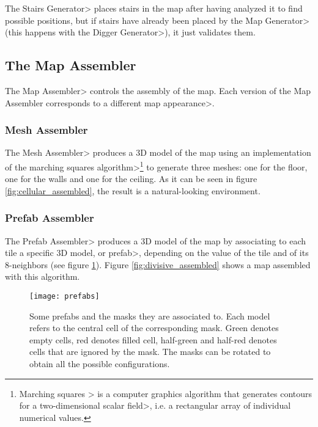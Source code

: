 The \<Stairs Generator> places stairs in the map after having analyzed it to find possible positions, but if stairs have already been placed by the \<Map Generator> (this happens with the \<Digger Generator>), it just validates them.


\subsection{The Map Assembler}

The \<Map Assembler> controls the assembly of the map. Each version of the Map Assembler corresponds to a different \<map appearance>.


\subsubsection{Mesh Assembler}

The \<Mesh Assembler> produces a 3D model of the map using an implementation of the \<marching squares algorithm>\footnote{\<Marching squares > is a computer graphics algorithm that generates contours for a \<two-dimensional scalar field>, i.e. a rectangular array of individual numerical values.} to generate three meshes: one for the floor, one for the walls and one for the ceiling. As it can be seen in figure \ref{fig:cellular_assembled}, the result is a natural-looking environment.


\subsubsection{Prefab Assembler}

The \<Prefab Assembler> produces a 3D model of the map by associating to each tile a specific 3D model, or \<prefab>, depending on the value of the tile and of its 8-neighbors (see figure \ref{fig:prefabs}). Figure \ref{fig:divisive_assembled} shows a map assembled with this algorithm.

\begin{figure}
\centering
\texttt{[image: prefabs]}
\caption[Some prefabs and the masks they are associated to.]{Some prefabs and the masks they are associated to. Each model refers to the central cell of the corresponding mask. Green denotes empty cells, red denotes filled cell, half-green and half-red denotes cells that are ignored by the mask. The masks can be rotated to obtain all the possible configurations.}
\label{fig:prefabs}
\end{figure}

